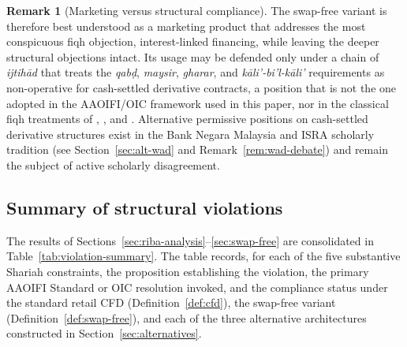 \documentclass[preprint,12pt,authoryear]{elsarticle}
\theoremstyle{definition}
\newtheorem{remark}{Remark}[section]
\begin{document}
\begin{remark}[Marketing versus structural compliance]
\label{rem:marketing-vs-structural}
The swap-free variant is therefore best understood as a marketing
product that addresses the most conspicuous fiqh objection,
interest-linked financing, while leaving the deeper structural
objections intact. Its usage may be defended only under a chain of
\emph{ijtih\={a}d} that treats the \emph{qab\d{d}}, \emph{maysir},
\emph{gharar}, and \emph{k\={a}li'-bi'l-k\={a}li'} requirements as
non-operative for cash-settled derivative contracts, a position
that is not the one adopted in the AAOIFI/OIC framework used in
this paper, nor in the classical fiqh treatments of
\citet{Kamali2000}, \citet{ElGamal2006}, and \citet{Usmani2002}.
Alternative permissive positions on cash-settled derivative
structures exist in the Bank Negara Malaysia and ISRA scholarly
tradition (see Section~\ref{sec:alt-wad} and
Remark~\ref{rem:wad-debate}) and remain the subject of active
scholarly disagreement.
\end{remark}

\subsection{Summary of structural violations}
\label{sec:violation-summary}

The results of
Sections~\ref{sec:riba-analysis}--\ref{sec:swap-free} are
consolidated in Table~\ref{tab:violation-summary}. The table
records, for each of the five substantive Shariah constraints, the
proposition establishing the violation, the primary AAOIFI Standard
or OIC resolution invoked, and the compliance status under the
standard retail CFD (Definition~\ref{def:cfd}), the swap-free
variant (Definition~\ref{def:swap-free}), and each of the three
alternative architectures constructed in
Section~\ref{sec:alternatives}.
\end{document}
